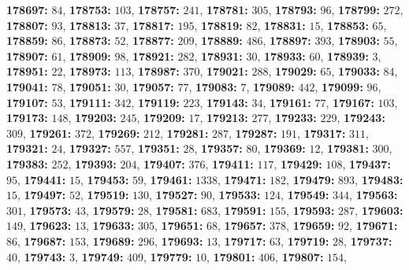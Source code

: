 \textsf{\bfseries 178697:} $84$, \textsf{\bfseries 178753:} $103$, \textsf{\bfseries 178757:} $241$, \textsf{\bfseries 178781:} $305$, \textsf{\bfseries 178793:} $96$, \textsf{\bfseries 178799:} $272$, \textsf{\bfseries 178807:} $93$, \textsf{\bfseries 178813:} $37$, \textsf{\bfseries 178817:} $195$, \textsf{\bfseries 178819:} $82$, \textsf{\bfseries 178831:} $15$, \textsf{\bfseries 178853:} $65$, \textsf{\bfseries 178859:} $86$, \textsf{\bfseries 178873:} $52$, \textsf{\bfseries 178877:} $209$, \textsf{\bfseries 178889:} $486$, \textsf{\bfseries 178897:} $393$, \textsf{\bfseries 178903:} $55$, \textsf{\bfseries 178907:} $61$, \textsf{\bfseries 178909:} $98$, \textsf{\bfseries 178921:} $282$, \textsf{\bfseries 178931:} $30$, \textsf{\bfseries 178933:} $60$, \textsf{\bfseries 178939:} $3$, \textsf{\bfseries 178951:} $22$, \textsf{\bfseries 178973:} $113$, \textsf{\bfseries 178987:} $370$, \textsf{\bfseries 179021:} $288$, \textsf{\bfseries 179029:} $65$, \textsf{\bfseries 179033:} $84$, \textsf{\bfseries 179041:} $78$, \textsf{\bfseries 179051:} $30$, \textsf{\bfseries 179057:} $77$, \textsf{\bfseries 179083:} $7$, \textsf{\bfseries 179089:} $442$, \textsf{\bfseries 179099:} $96$, \textsf{\bfseries 179107:} $53$, \textsf{\bfseries 179111:} $342$, \textsf{\bfseries 179119:} $223$, \textsf{\bfseries 179143:} $34$, \textsf{\bfseries 179161:} $77$, \textsf{\bfseries 179167:} $103$, \textsf{\bfseries 179173:} $148$, \textsf{\bfseries 179203:} $245$, \textsf{\bfseries 179209:} $17$, \textsf{\bfseries 179213:} $277$, \textsf{\bfseries 179233:} $229$, \textsf{\bfseries 179243:} $309$, \textsf{\bfseries 179261:} $372$, \textsf{\bfseries 179269:} $212$, \textsf{\bfseries 179281:} $287$, \textsf{\bfseries 179287:} $191$, \textsf{\bfseries 179317:} $311$, \textsf{\bfseries 179321:} $24$, \textsf{\bfseries 179327:} $557$, \textsf{\bfseries 179351:} $28$, \textsf{\bfseries 179357:} $80$, \textsf{\bfseries 179369:} $12$, \textsf{\bfseries 179381:} $300$, \textsf{\bfseries 179383:} $252$, \textsf{\bfseries 179393:} $204$, \textsf{\bfseries 179407:} $376$, \textsf{\bfseries 179411:} $117$, \textsf{\bfseries 179429:} $108$, \textsf{\bfseries 179437:} $95$, \textsf{\bfseries 179441:} $15$, \textsf{\bfseries 179453:} $59$, \textsf{\bfseries 179461:} $1338$, \textsf{\bfseries 179471:} $182$, \textsf{\bfseries 179479:} $893$, \textsf{\bfseries 179483:} $15$, \textsf{\bfseries 179497:} $52$, \textsf{\bfseries 179519:} $130$, \textsf{\bfseries 179527:} $90$, \textsf{\bfseries 179533:} $124$, \textsf{\bfseries 179549:} $344$, \textsf{\bfseries 179563:} $301$, \textsf{\bfseries 179573:} $43$, \textsf{\bfseries 179579:} $28$, \textsf{\bfseries 179581:} $683$, \textsf{\bfseries 179591:} $155$, \textsf{\bfseries 179593:} $287$, \textsf{\bfseries 179603:} $149$, \textsf{\bfseries 179623:} $13$, \textsf{\bfseries 179633:} $305$, \textsf{\bfseries 179651:} $68$, \textsf{\bfseries 179657:} $378$, \textsf{\bfseries 179659:} $92$, \textsf{\bfseries 179671:} $86$, \textsf{\bfseries 179687:} $153$, \textsf{\bfseries 179689:} $296$, \textsf{\bfseries 179693:} $13$, \textsf{\bfseries 179717:} $63$, \textsf{\bfseries 179719:} $28$, \textsf{\bfseries 179737:} $40$, \textsf{\bfseries 179743:} $3$, \textsf{\bfseries 179749:} $409$, \textsf{\bfseries 179779:} $10$, \textsf{\bfseries 179801:} $406$, \textsf{\bfseries 179807:} $154$, 
